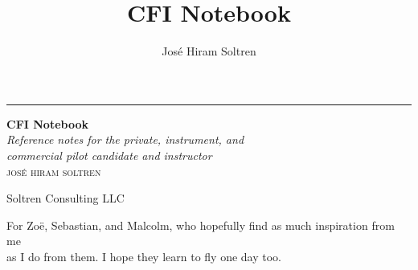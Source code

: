 \documentclass[12pt,twoside,letterpaper]{report}
\author{Jos\'e Hiram Soltren}
\title{CFI Notebook}
\newenvironment{dedication}
  {\clearpage           %
   \thispagestyle{empty}%
   \vspace*{\stretch{1}}%
   \itshape             %
   \raggedleft          %
  }
  {\par %
   \vspace{\stretch{3}} %
   \clearpage           %
  }
\begin{document}


\begin{titlepage} %

\raggedleft %
\rule{1pt}{\textheight} %
\hspace{0.05\textwidth} %
\parbox[b]{0.75\textwidth}{ %
{\Huge\bfseries CFI Notebook}\\[2\baselineskip] %
{\large\textit{Reference notes for the private, instrument, and \\ 
    commercial pilot candidate and instructor}}\\[4\baselineskip] %
{\Large\textsc{jos\'e hiram soltren}} %

\vspace{0.5\textheight} %

{\noindent Soltren Consulting LLC}\\[\baselineskip] %
}

\end{titlepage}

\begin{dedication}
For Zo\"e, Sebastian, and Malcolm, who hopefully find as much inspiration from me \\
as I do from them. I hope they learn to fly one day too.
\end{dedication}


\pagebreak


\tableofcontents





\printbibliography
\end{document}
